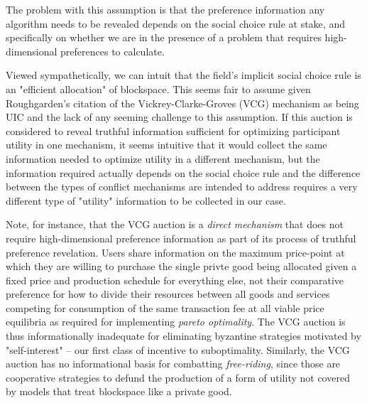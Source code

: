 \documentclass[sigconf,anonymous]{aamas}
\begin{document}
The problem with this assumption is that the preference information any algorithm needs to be revealed depends on the social choice rule at stake, and specifically on whether we are in the presence of a problem that requires high-dimensional preferences to calculate.

Viewed sympathetically, we can intuit that the field's implicit social choice rule is an "efficient allocation" of blockspace. This seems fair to assume given Roughgarden's citation of the Vickrey-Clarke-Groves (VCG) mechanism as being UIC and the lack of any seeming challenge to this assumption. If this auction is considered to reveal truthful information sufficient for optimizing participant utility in one mechanism, it seems intuitive that it would collect the same information needed to optimize utility in a different mechanism, but the information required actually depends on the social choice rule and the difference between the types of conflict mechanisms are intended to address requires a very different type of "utility" information to be collected in our case.

Note, for instance, that the VCG auction is a \textit{direct mechanism} that does not require high-dimensional preference information as part of its process of truthful preference revelation. Users share information on the maximum price-point at which they are willing to purchase the single privte good being allocated given a fixed price and production schedule for everything else, not their comparative preference for how to divide their resources between all goods and services competing for consumption of the same transaction fee at all viable price equilibria as required for implementing \textit{pareto optimality}. The VCG auction is thus informationally inadequate for eliminating byzantine strategies motivated by "self-interest" -- our first class of incentive to suboptimality. Similarly, the VCG auction has no informational basis for combatting \textit{free-riding}, since those are cooperative strategies to defund the production of a form of utility not covered by models that treat blockspace like a private good.
\end{document}
